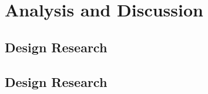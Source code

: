 
\chapter{Analysis and Discussion} %

\label{AnalysisAndDiscussion} %


\section{Design Research}

\section{Design Research}